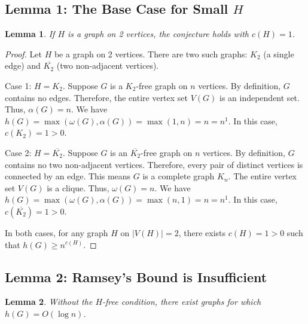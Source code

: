 \documentclass[12pt, a4paper]{article}
\newtheorem{lemma}{Lemma}
\begin{document}
\subsection{Lemma 1: The Base Case for Small $H$}

\begin{lemma}
If $H$ is a graph on 2 vertices, the conjecture holds with $c(H) = 1$.
\end{lemma}

\begin{proof}
Let $H$ be a graph on 2 vertices. There are two such graphs: $K_2$ (a single edge) and $\overline{K_2}$ (two non-adjacent vertices).

Case 1: $H = K_2$.
Suppose $G$ is a $K_2$-free graph on $n$ vertices. By definition, $G$ contains no edges. Therefore, the entire vertex set $V(G)$ is an independent set. Thus, $\alpha(G) = n$.
We have $h(G) = \max(\omega(G), \alpha(G)) = \max(1, n) = n = n^1$.
In this case, $c(K_2) = 1 > 0$.

Case 2: $H = \overline{K_2}$.
Suppose $G$ is an $\overline{K_2}$-free graph on $n$ vertices. By definition, $G$ contains no two non-adjacent vertices. Therefore, every pair of distinct vertices is connected by an edge. This means $G$ is a complete graph $K_n$.
The entire vertex set $V(G)$ is a clique. Thus, $\omega(G) = n$.
We have $h(G) = \max(\omega(G), \alpha(G)) = \max(n, 1) = n = n^1$.
In this case, $c(\overline{K_2}) = 1 > 0$.

In both cases, for any graph $H$ on $|V(H)| = 2$, there exists $c(H) = 1 > 0$ such that $h(G) \geq n^{c(H)}$.
\end{proof}

\subsection{Lemma 2: Ramsey's Bound is Insufficient}

\begin{lemma}
Without the $H$-free condition, there exist graphs for which $h(G) = O(\log n)$.
\end{lemma}
\end{document}
